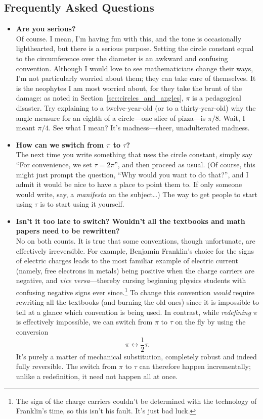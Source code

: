   \subsection{Frequently Asked Questions} %
  \label{sec:faq}

\begin{itemize}

  \item \textbf{Are you serious?} \\ Of course. I mean, I'm having fun with this, and the tone is occasionally lighthearted, but there is a serious purpose. Setting the circle constant equal to the circumference over the diameter is an awkward and confusing convention. Although I would love to see mathematicians change their ways, I'm not particularly worried about them; they can take care of themselves. It is the neophytes I am most worried about, for they take the brunt of the damage: as noted in Section~\ref{sec:circles_and_angles}, $\pi$ is a pedagogical disaster. Try explaining to a twelve-year-old (or to a thirty-year-old) why the angle measure for an eighth of a circle---one slice of pizza---is $\pi/8$. Wait, I meant $\pi/4$. See what I mean? It's madness---sheer, unadulterated madness.

  \item \textbf{How can we switch from $\pi$ to $\tau$?} \\ The next time you write something that uses the circle constant, simply say ``For convenience, we set $\tau = 2\pi$'', and then proceed as usual. (Of course, this might just prompt the question, ``Why would you want to do that?'', and I admit it would be nice to have a place to point them to. If only someone would write, say, a \emph{manifesto} on the subject\ldots) The way to get people to start using $\tau$ is to start using it yourself.

  \item \textbf{Isn't it too late to switch? Wouldn't all the textbooks and math papers need to be rewritten?} \\ No on both counts. It is true that some conventions, though unfortunate, are effectively irreversible. For example, Benjamin Franklin's choice for the signs of electric charges leads to the most familiar example of electric current (namely, free electrons in metals) being positive when the charge carriers are negative, and \emph{vice versa}---thereby cursing beginning physics students with confusing negative signs ever since.\footnote{The sign of the charge carriers couldn't be determined with the technology of Franklin's time, so this isn't his fault. It's just bad luck.} To change this convention \emph{would} require rewriting all the textbooks (and burning the old ones) since it is impossible to tell at a glance which convention is being used. In contrast, while \emph{redefining} $\pi$ is effectively impossible, we can switch from $\pi$ to $\tau$ on the fly by using the conversion \[ \pi \leftrightarrow \textstyle{\frac{1}{2}}\tau. \] It's purely a matter of mechanical substitution, completely robust and indeed fully reversible. The switch from $\pi$ to $\tau$ can therefore happen incrementally; unlike a redefinition, it need not happen all at once.


\end{itemize}
